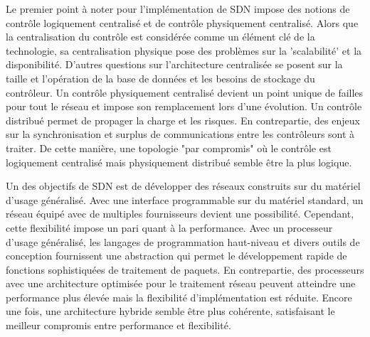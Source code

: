 Le premier point à noter pour l'implémentation de SDN impose des notions de contrôle logiquement centralisé et de contrôle physiquement centralisé. Alors que la centralisation du contrôle est considérée comme un élément clé de la technologie, sa centralisation physique pose des problèmes sur la 'scalabilité' et la disponibilité. D'autres questions sur l'architecture centralisée se posent sur la taille et l'opération de la base de données et les besoins de stockage du contrôleur. Un contrôle physiquement centralisé devient un point unique de failles pour tout le réseau et impose son remplacement lors d'une évolution. Un contrôle distribué permet de propager la charge et les risques. En contrepartie, des enjeux sur la synchronisation et surplus de communications entre les contrôleurs sont à traiter. De cette manière, une topologie "par compromis" où le contrôle est logiquement centralisé mais physiquement distribué semble être la plus logique. \cite{sdnbookControlDataPlanes} \cite{SurveySDNArchi}



Un des objectifs de SDN est de développer des réseaux construits sur du matériel d'usage généralisé. Avec une interface programmable sur du matériel standard, un réseau équipé avec de multiples fournisseurs devient une possibilité. Cependant, cette flexibilité impose un pari quant à la performance. Avec un processeur d'usage généralisé, les langages de programmation haut-niveau et divers outils de conception fournissent une abstraction qui permet le développement rapide de fonctions sophistiquées de traitement de paquets. En contrepartie, des processeurs avec une architecture optimisée pour le traitement réseau peuvent atteindre une performance plus élevée mais la flexibilité d'implémentation est réduite. Encore une fois, une architecture hybride semble être plus cohérente, satisfaisant le meilleur compromis entre performance et flexibilité. \cite{ImplementationKeyChallenges}



